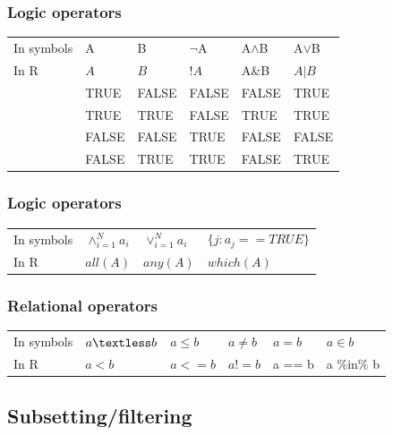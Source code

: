\documentclass{beamer}
\begin{document}
\begin{frame}
	\frametitle{Logic operators}
	\begin{table}
		\begin{tabular}{l l l l l l}
			\toprule
			In symbols & A & B & $\neg$A & A$\land$B & A$\lor$B\\
			In R & $A$ & $B$ & $!A$ & A\&B & $A \vert B$ \\
			& TRUE & FALSE & FALSE & FALSE & TRUE \\
			& TRUE & TRUE & FALSE & TRUE & TRUE \\
			& FALSE & FALSE & TRUE & FALSE & FALSE \\
			& FALSE & TRUE & TRUE & FALSE & TRUE \\
			\bottomrule
		\end{tabular}
	\end{table}
\end{frame}

\begin{frame}
	\frametitle{Logic operators}
	\begin{table}
		\begin{tabular}{l l l l}
			\toprule
			In symbols & $\land_{i=1}^{N}a_i$ & $\lor_{i=1}^{N}a_i$ & $\{j : 
			a_j==TRUE\}$\\
			In R & $all(A)$ & $any(A)$ & $which(A)$ \\
			\bottomrule
		\end{tabular}
	\end{table}
\end{frame}


\begin{frame}
	\frametitle{Relational operators}
	\begin{table}
		\begin{tabular}{l l l l l l}
			\toprule
			In symbols & $a \textless b$ & $a \leq  b$ & $a \neq  b$ & $a =  
			b$ & $a \in b$ \\
			In R & $a < b$ & $a <= b$ & $a != b$ & a == b & a \%in\% b \\
			\bottomrule
		\end{tabular}
	\end{table}
\end{frame}

\subsection{Subsetting/filtering}
\end{document}
